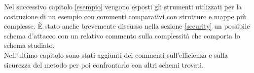 Nel successivo capitolo \ref{esempio} vengono esposti gli strumenti utilizzati per la costruzione di un esempio con commenti comparativi con strutture e mappe più complesse. È stato anche brevemente discusso nella sezione \ref{security} un possibile schema d'attacco con un relativo commento sulla complessità che comporta lo schema studiato.\\[0.2cm]

Nell'ultimo capitolo sono stati aggiunti dei commenti sull'efficienza e sulla sicurezza del metodo per poi confrontarlo con altri schemi trovati.



